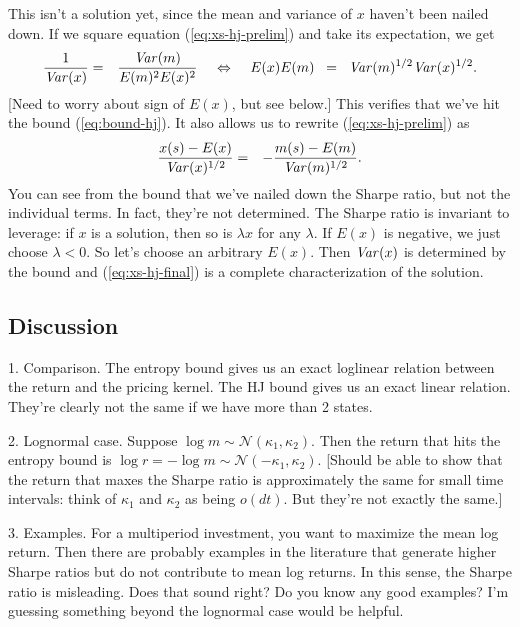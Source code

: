 \documentclass[11pt]{article}
\newcommand{\var}{\mbox{\it Var\/}}
\begin{document}
This isn't a solution yet, since the mean and variance of $x$
haven't been nailed down.
If we square equation (\ref{eq:xs-hj-prelim}) and take its expectation,
we get
\begin{eqnarray*}
    \frac{1}{\var(x)}  &=& \frac{\var(m)} {E(m)^2 E(x)^2}
    \;\;\;\; \Leftrightarrow \;\;\;\;
    E(x) E(m)  \;\;=\;\; \var(m)^{1/2}\var(x)^{1/2} .
\end{eqnarray*}
[Need to worry about sign of $E(x)$, but see below.]
This verifies that we've hit the bound (\ref{eq:bound-hj}).
It also allows us to rewrite (\ref{eq:xs-hj-prelim}) as
\begin{eqnarray}
    \frac{x(s) - E(x)}{\var(x)^{1/2}} &=& -
                \frac{m(s) - E(m)}{\var(m)^{1/2}} .
                \label{eq:xs-hj-final}
\end{eqnarray}
You can see from the bound that we've nailed down the Sharpe ratio,
but not the individual terms.
In fact, they're not determined.
The Sharpe ratio is invariant to leverage:
if $x$ is a solution, then so is $\lambda x$ for any $\lambda$.
If $E(x)$ is negative, we just choose $\lambda<0$.
So let's choose an arbitrary $E(x)$.
Then $\var(x)$ is determined by the bound and
(\ref{eq:xs-hj-final}) is a complete characterization of the solution.


\subsection*{Discussion}

1. Comparison.  The entropy bound gives us an exact loglinear relation
between the return and the pricing kernel.
The HJ bound gives us an exact linear relation.
They're clearly not the same if we have more than 2 states.

2. Lognormal case.
Suppose $\log m \sim \mathcal{N}(\kappa_1,\kappa_2)$.
Then the return that hits the entropy bound is
$\log r = - \log m \sim \mathcal{N}(-\kappa_1,\kappa_2)$.
[Should be able to show that the return that maxes the Sharpe
ratio is approximately the same for small time intervals:
think of $\kappa_1$ and $\kappa_2$ as being $o(dt)$.
But they're not exactly the same.]

3. Examples.  For a multiperiod investment, you want to
maximize the mean log return.
Then there are probably examples in the literature that generate higher
Sharpe ratios but do not contribute to mean log returns.
In this sense, the Sharpe ratio is misleading.
Does that sound right?  Do you know any good examples?  I'm guessing
something beyond the lognormal case would be helpful.

\end{document}

